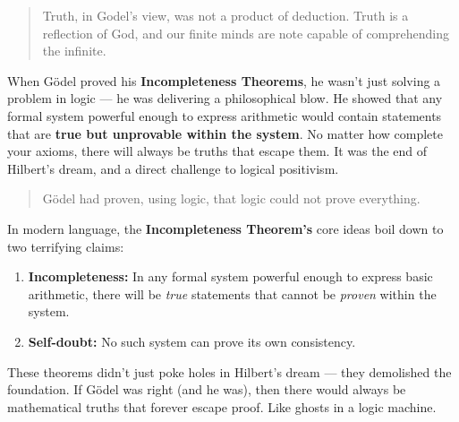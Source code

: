 \begin{quote}
  Truth, in Godel's view, was not a product of deduction. Truth is a reflection of God, and our finite minds are note capable of comprehending the infinite.
\end{quote}

When Gödel proved his \textbf{Incompleteness Theorems}, he wasn’t just solving a problem in logic — he was delivering a philosophical blow. He showed that any formal system powerful enough to express arithmetic would contain statements that are \textbf{true but unprovable within the system}. No matter how complete your axioms, there will always be truths that escape them.  It was the end of Hilbert’s dream, and a direct challenge to logical positivism.

\begin{quote}
Gödel had proven, using logic, that logic could not prove everything.
\end{quote}


In modern language, the \textbf{Incompleteness Theorem's} core ideas boil down to two terrifying claims:

\begin{enumerate}
    \item \textbf{Incompleteness:} In any formal system powerful enough to express basic arithmetic, there will be \emph{true} statements that cannot be \emph{proven} within the system.
    \item \textbf{Self-doubt:} No such system can prove its own consistency.
\end{enumerate}

\medskip

\noindent These theorems didn’t just poke holes in Hilbert’s dream — they demolished the foundation. If Gödel was right (and he was), then there would always be mathematical truths that forever escape proof. Like ghosts in a logic machine.

\medskip

